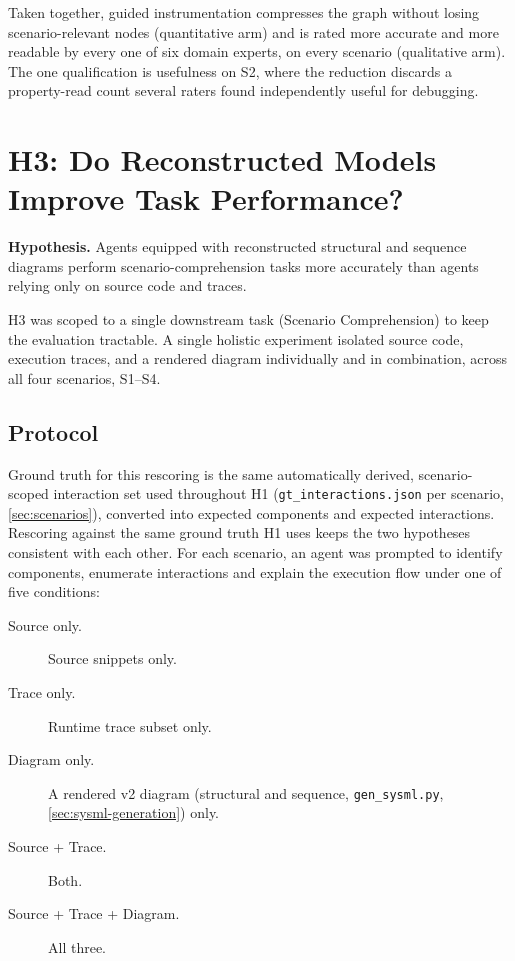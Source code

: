 Taken together, guided instrumentation compresses the graph without
losing scenario-relevant nodes (quantitative arm) and is rated more
accurate and more readable by every one of six domain experts, on every
scenario (qualitative arm). The one qualification is usefulness on S2,
where the reduction discards a property-read count several raters found
independently useful for debugging.

\section{H3: Do Reconstructed Models Improve Task Performance?}\label{sec:h3}

\textbf{Hypothesis.} Agents equipped with reconstructed structural and
sequence diagrams perform scenario-comprehension tasks more accurately
than agents relying only on source code and traces.

H3 was scoped to a single downstream task (Scenario Comprehension) to
keep the evaluation tractable. A single holistic experiment isolated
source code, execution traces, and a rendered diagram individually and
in combination, across all four scenarios, S1--S4.

\subsection{Protocol}

Ground truth for this rescoring is the same automatically derived,
scenario-scoped interaction set used throughout H1
(\texttt{gt\_interactions.json} per scenario, \cref{sec:scenarios}),
converted into expected components and expected interactions. Rescoring against the same ground
truth H1 uses keeps the two hypotheses consistent with each other. For
each scenario, an agent was prompted to identify components, enumerate
interactions and explain the execution flow under one of five
conditions:

\begin{description}
  \item[Source only.] Source snippets only.
  \item[Trace only.] Runtime trace subset only.
  \item[Diagram only.] A rendered \sysml v2 diagram (structural and
    sequence, \texttt{gen\_sysml.py}, \cref{sec:sysml-generation}) only.
  \item[Source + Trace.] Both.
  \item[Source + Trace + Diagram.] All three.
\end{description}

